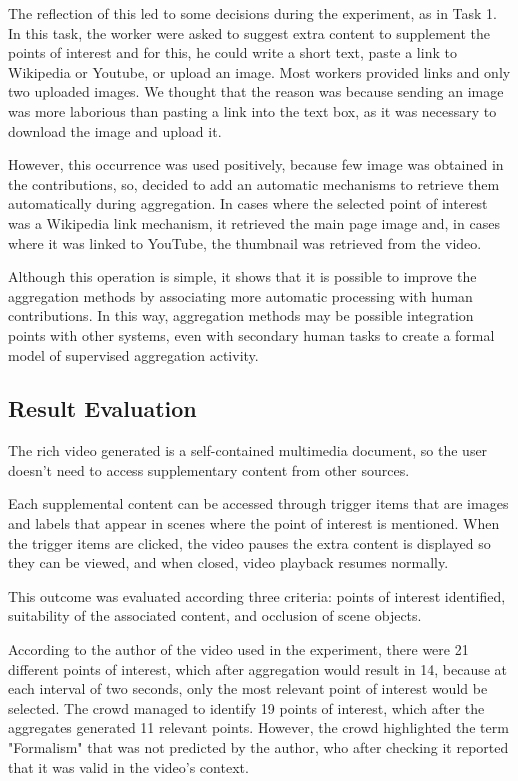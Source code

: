 The reflection of this led to some decisions during the experiment, as in Task 1. In this task, the worker were asked to suggest extra content to supplement the points of interest and for this, he could write a short text, paste a link to Wikipedia or Youtube, or upload an image. Most workers provided links and only two uploaded images. We thought that the reason was because sending an image was more laborious than pasting a link into the text box, as it was necessary to download the image and upload it.

However, this occurrence was used positively, because few image was obtained in the contributions, so, decided to add an automatic mechanisms to retrieve them automatically during aggregation. In cases where the selected point of interest was a Wikipedia link mechanism, it retrieved the main page image and, in cases where it was linked to YouTube, the thumbnail was retrieved from the video.

Although this operation is simple, it shows that it is possible to improve the aggregation methods by associating more automatic processing with human contributions. In this way, aggregation methods may be possible integration points with other systems, even with secondary human tasks to create a formal model of supervised aggregation activity.

\subsection{Result Evaluation}
The rich video generated is a self-contained multimedia document, so the user doesn't need to access supplementary content from other sources.

Each supplemental content can be accessed through trigger items that are images and labels that appear in scenes where the point of interest is mentioned. When the trigger items are clicked, the video pauses the extra content is displayed so they can be viewed, and when closed, video playback resumes normally.

This outcome was evaluated according three criteria: points of interest identified, suitability of the associated content, and occlusion of scene objects.

According to the author of the video used in the experiment, there were 21 different points of interest, which after aggregation would result in 14, because at each interval of two seconds, only the most relevant point of interest would be selected. The crowd managed to identify 19 points of interest, which after the aggregates generated 11 relevant points. However, the crowd highlighted the term "Formalism" that  was not predicted by the author, who after checking it reported that it was valid in the video's context.

